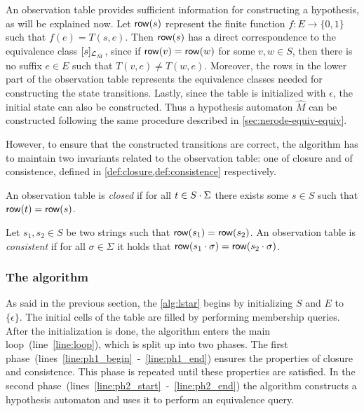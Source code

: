 An observation table provides sufficient information for constructing a
hypothesis, as will be explained now. Let $\mathsf{row}(s)$ represent the finite
function $f : E \rightarrow \{0,1\}$ such that $f(e) = T(s,e)$. Then $\mathsf{row}(s)$
has a direct correspondence to the equivalence class $[s]_{\mathcal{L}_{\hat M}}$,
since if $\mathsf{row}(v) = \mathsf{row}(w)$ for some $v,w \in S$, then there is no suffix
$e \in E$ such that $T(v,e) \neq T(w,e)$. Moreover, the rows in the lower part
of the observation table represents the equivalence classes needed for
constructing the state transitions. Lastly, since the table is initialized with
$\epsilon$, the initial state can also be constructed. Thus a hypothesis
automaton $\hat M$ can be constructed following the same procedure described in
\cref{sec:nerode-equiv-equiv}.

However, to ensure that the constructed transitions are correct, the algorithm
has to maintain two invariants related to the observation table: one of closure
and of consistence, defined in \cref{def:closure,def:consistence} respectively.

\begin{definition}[Closure]\label{def:closure}
  An observation table is \textit{closed} if for all $t \in S\cdot \Sigma$
  there exists some $s \in S$ such that $\mathsf{row}(t) = \mathsf{row}(s)$.
\end{definition}
\begin{definition}[Consistence]\label{def:consistence}
  Let $s_1, s_2 \in S$ be two strings such that $\mathsf{row}(s_1) = \mathsf{row}(s_2)$. An
  observation table is \textit{consistent} if for all $\sigma \in \Sigma$ it
  holds that $\mathsf{row}(s_1\cdot\sigma) = \mathsf{row}(s_2\cdot\sigma)$.
\end{definition}

\newpage
\subsubsection{The algorithm}
\label{sec:algorithm}
As said in the previous section, the \cref{alg:lstar} begins by initializing
$S$ and $E$ to $\{\epsilon\}$. The initial cells of the table are filled by
performing membership queries. After the initialization is done, the algorithm
enters the main loop~(line~\ref{line:loop}), which is split up into two
phases. The first phase~(lines~\ref{line:ph1_begin}~-~\ref{line:ph1_end})
ensures the properties of closure and consistence. This phase is repeated
until these properties are satisfied. In the second
phase~(lines~\ref{line:ph2_start}~-~\ref{line:ph2_end}) the algorithm
constructs a hypothesis automaton and uses it to perform an equivalence query.

